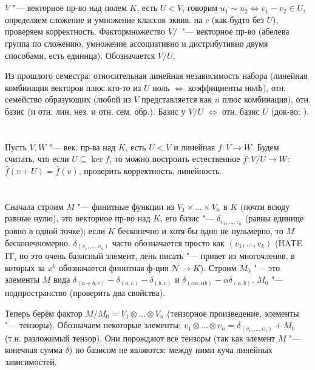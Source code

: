 \section{} %
$V$ "--- векторное пр-во над полем $K$, есть $U < V$, говорим $u_1 \sim u_2 \iff v_1-v_2 \in U$,
определяем сложение и умножение классов эквив. на $c$ (как будто без $U$),
проверяем корректность.
Фактормножество $V/~$ "--- векторное пр-во (абелева группа по сложению, умножение
ассоциативно и дистрибутивно двумя способами, есть единица).
Обозначается $V/U$.

Из прошлого семестра: относительная линейная независимость набора
(линейная комбинация векторов плюс кто-то из $U$ ноль $\iff$ коэффициенты нолЬ),
отн. семейство образующих (любой из $V$ представляется как $u$ плюс комбинация),
отн. базис (и отн. лин. нез. и отн. сем. обр.).
Базис у $V/U$ $\iff$ отн. базис $U$ (док-во: \TODO).

\section{} %
Пусть $V, W$ "--- век. пр-ва над $K$, есть $U < V$ и линейная $f \colon V \to W$.
Будем считать, что если $U \subseteq \ker f$, то можно построить естественное
$\bar f \colon V/U \to W$: $\bar f(v+U) = \bar f(v)$, проверить корректность, линейность.

\section{} %
Сначала строим $M$ "--- финитные функции из $V_1 \times \dots \times V_n$ в $K$
(почти всюду равные нулю), это векторное пр-во над $K$, его базис "---
$\delta_{v_1, \dots, v_n}$ (равны единице ровно в одной точке); если $K$ бесконечно
и хотя бы одно не нульмерно, то $M$ бесконечномерно.
$\delta_{(v_1, \dots, v_n)}$ часто обозначается просто как $(v_1, \dots, v_k)$ (HATE IT, но это очень базисный элемент,
лень писать "--- привет из многочленов, в которых за $x^k$ обозначается финитная ф-ция $\mathcal N \to K$).
Строим $M_0$ "--- это элементы $M$ вида $\delta_{(a+b,c)}-\delta_{(a,c)}-\delta_{(b,c)}$ и
$\delta_{(\alpha a, \alpha b)} - \alpha\delta_{(a, b)}$.
$M_0$ "--- подпространство (проверить два свойства).

Теперь берём фактор $M/M_0=V_1\otimes \dots \otimes V_n$ (тензорное произведение, элементы "--- тензоры).
Обозначаем некоторые элементы: $v_1\otimes \dots \otimes v_n = \delta_{(v_1, \dots, v_n)} + M_0$
(т.н. разложимый тензор).
Они порождают все тензоры (так как элемент $M$ "--- конечная сумма $\delta$)
но базисом не являются: между ними куча линейных зависимостей.


